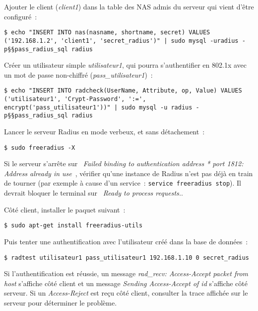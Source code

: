 \label{ajout-nas}
Ajouter le client (\emph{client1}) dans la table des NAS admis du serveur qui vient d'être configuré~:

\begin{lstlisting}
$ echo "INSERT INTO nas(nasname, shortname, secret) VALUES ('192.168.1.2', 'client1', 'secret_radius')" | sudo mysql -uradius -p§§pass_radius_sql radius
\end{lstlisting}

\label{ajout-utilisateur-md5}
Créer un utilisateur simple \emph{utilisateur1}, qui pourra s'authentifier en 802.1x avec un mot de passe non-chiffré (\emph{pass\_utilisateur1})~:

\begin{lstlisting}
$ echo "INSERT INTO radcheck(UserName, Attribute, op, Value) VALUES ('utilisateur1', 'Crypt-Password', ':=', encrypt('pass_utilisateur1'))" | sudo mysql -u radius -p§§pass_radius_sql radius
\end{lstlisting}

\label{freeradius-x}
Lancer le serveur Radius en mode verbeux, et sans détachement~:

\begin{lstlisting}
$ sudo freeradius -X
\end{lstlisting}

Si le serveur s'arrête sur \og~\emph{Failed binding to authentication address * port 1812{}: Address already in use}~\fg{}, vérifier qu'une instance de Radius n'est pas déjà en train de tourner (par exemple à cause d'un service~: \texttt{service freeradius stop}). Il devrait bloquer le terminal sur \og~\emph{Ready to process requests.}\fg{}.

Côté client, installer le paquet suivant~:

\begin{lstlisting}
$ sudo apt-get install freeradius-utils
\end{lstlisting}

Puis tenter une authentification avec l'utilisateur créé dans la base de données~:

\begin{lstlisting}
$ radtest utilisateur1 pass_utilisateur1 192.168.1.10 0 secret_radius
\end{lstlisting}

Si l'authentification est réussie, un message \og\emph{rad\_recv: Access-Accept packet from host}\fg{} s'affiche côté client et un message \og\emph{Sending Access-Accept of id}\fg{} s'affiche côté serveur. Si un \emph{Access-Reject} est reçu côté client, consulter la trace affichée sur le serveur pour déterminer le problème.

